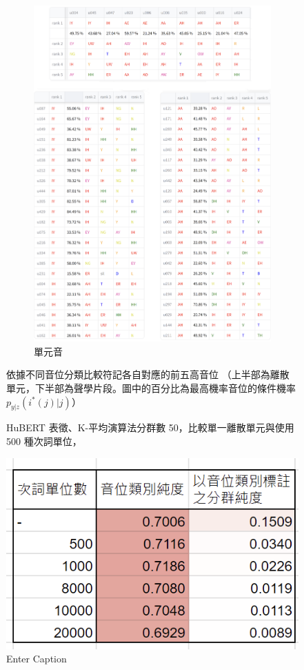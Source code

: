{{\begin{figure}
\begin{subfigure}{\textwidth}
                 \includegraphics[width=\tempwidth]{chapters/vow_phn.png}
                 \caption{單元音}
                 \label{fig:hub-u050-ap0500-vowobs}
             \end{subfigure}

             \caption{HuBERT 表徵、K-平均演算法分群數 50，比較單一離散單元與使用 500 種次詞單位，}
             依據不同音位分類比較符記各自對應的前五高音位
             （上半部為離散單元，下半部為聲學片段。圖中的百分比為最高機率音位的條件機率 $p_{y|z}(i^*(j)|j)$）
                         \label{fig:hub-u050-phnobserver}
        \end{figure}
    }

\begin{figure}
    \centering
    \includegraphics[width=0.5\linewidth]{.vscode/hub50clspur.png}
    \caption{Enter Caption}
    \label{fig:enter-label}
\end{figure}

}
